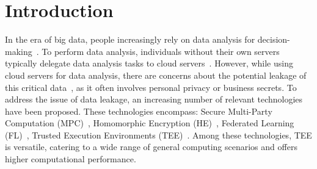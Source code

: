 \section{Introduction}
In the era of big data, people increasingly rely on data analysis for decision-making~\cite{albright2020business}. 
To perform data analysis, individuals without their own servers typically delegate data analysis tasks to cloud servers~\cite{sandhu2021big}. However, while using cloud servers for data analysis, there are concerns about the potential leakage of this critical data~\cite{purohit2013data}, as it often involves personal privacy or business secrets.
To address the issue of data leakage, an increasing number of relevant technologies have been proposed. These technologies encompass: Secure Multi-Party Computation (MPC)~\cite{lindell2020secure,patra2021aby2,dalskov2022fast}, Homomorphic Encryption (HE)~\cite{marcolla2022survey,lu2021pegasus,bossuat2021efficient}, Federated Learning (FL)~\cite{li2021survey,bonawitz2017practical,shayan2020biscotti}, Trusted Execution Environments (TEE)~\cite{zheng2021survey,tsai2017graphene,priebe2018enclavedb}.
Among these technologies, TEE is versatile, catering to a wide range of general computing scenarios and offers higher computational performance.
